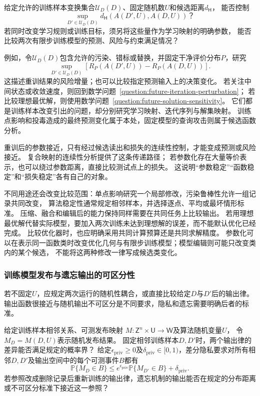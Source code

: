 \begin{mathproblem}[训练样本变换造成的训练模型差异]
  \label{question:future-perturbation-map}
  给定允许的训练样本变换集合$\mathcal U_D(D)$、固定随机数$U$和候选距离$d_{\mathsf H}$，
  能否控制
  \[
    \sup_{D'\in\mathcal U_D(D)}
      d_{\mathsf H}(A(D',U),A(D,U))\text{？}
  \]
  若同时改变学习规则或训练目标，须另将这些量作为学习映射的明确参数，
  能否比较两次有限步训练模型的预测、风险与约束满足情况？
\end{mathproblem}

例如，令$\mathcal U_D(D)$包含允许的污染、错标或替换，并固定干净评价分布$P$，研究
\begin{equation}
  \sup_{D'\in\mathcal U_D(D)}
  \left[R_P(A(D',U))-R_P(A(D,U))\right].
  \label{eq:future-training-robustness-question}
\end{equation}
这描述重训结果的风险增量；也可以比较指定预测输入上的决策变化。
若关注中间状态或收敛速度，则回到数学问题~\ref{question:future-iteration-perturbation}；
若比较理想最优解，则使用数学问题~\ref{question:future-solution-sensitivity}。
它们都是训练样本改变引出的问题，却分别研究学习映射、迭代序列与解集映射。
训练点影响和投毒造成的最终预测变化属于本处，固定模型的查询攻击则属于候选函数分析。

重训后的参数接近，只有经过候选读出和损失的连续性控制，才能变成预测或风险接近。
复合映射的连续性分析提供了这条传递路径；
若参数化存在大量等价表示，也可以绕过参数距离，直接比较测试点上的损失。
这说明“参数稳定”“函数稳定”和“损失稳定”各有自己的对象。

不同用途还会改变比较范围：单点影响研究一个局部修改，污染鲁棒性允许一组记录共同改变，
算法稳定性通常规定相邻样本，并选择逐点、平均或最坏情形标准。
压缩、融合和编辑后的能力保持同样需要在共同任务上比较输出。
若用理想最优解代替实际模型，要加入两次训练未达到理想解的误差，而不能默认优化已经完成。
比较优化器时，也应明确采用共同计算预算还是共同求解精度。
参数化可以在表示同一函数类时改变优化几何与有限步训练模型；模型编辑则可能只改变类内的某个候选，
不能将这两种修改一律写成候选类变化。

\subsubsection{训练模型发布与遗忘输出的可区分性}
\label{sec:future-analysis-output-law}

若不固定$U$，应规定两次运行的随机性耦合，或直接比较给定$D$与$D'$后的输出律。
输出函数很接近与随机输出不可区分是不同要求，隐私和遗忘需要明确后者的标准。

\begin{mathproblem}[随机输出律的可区分程度]
  \label{question:future-output-law}
  给定训练样本相邻关系、可测发布映射
  $M:\mathsf Z^n\times\mathsf U\to\mathsf W$及算法随机变量$U$，
  令$M_D=M(D,U)$表示随机发布结果。
  固定相邻训练样本$D,D'$时，两个输出律的差异能否满足规定的概率界？
  给定$\epsilon_{\mathrm{priv}}\geq0$及$\delta_{\mathrm{priv}}\in[0,1)$，差分隐私要求对所有相邻$D,D'$及输出空间中的每个可测事件$B$都有
  \[
    \mathbb P\{M_D\in B\}
    \leq e^{\epsilon_{\mathrm{priv}}}
       \mathbb P\{M_{D'}\in B\}+\delta_{\mathrm{priv}}.
  \]
  若参照改成删除记录后重新训练的输出律，遗忘机制的输出能否在规定的分布距离
  或不可区分标准下接近这一参照？
\end{mathproblem}

